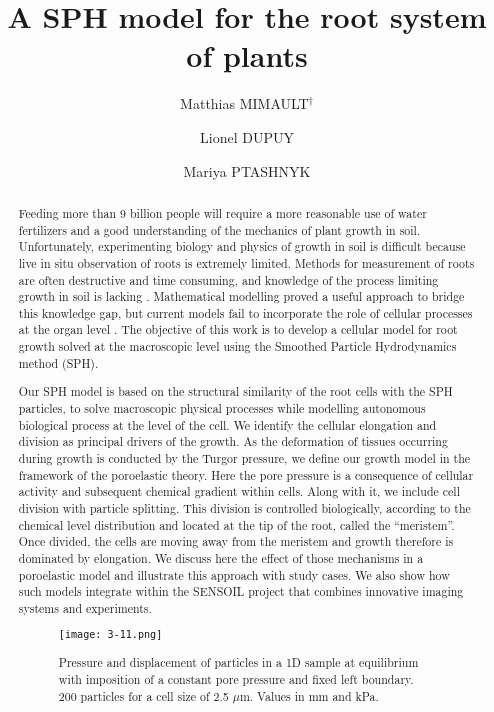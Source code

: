 \documentclass[10pt]{article}
\title{A SPH model for the root system of plants}
\date{}
\author[1]{Matthias MIMAULT$^\dagger$}
\author[1]{Lionel DUPUY}
\affil[1]{James Hutton Institute, UK}
\author[2]{Mariya PTASHNYK}
\affil[2]{University of Dundee, UK}
\affil[$\relax$]{\email{\dagger}{matthias.mimault@hutton.ac.uk}}
\begin{document}
\maketitle


\begin{abstract}
Feeding more than 9 billion people will require a more reasonable use of water fertilizers and a good understanding of the mechanics of plant growth in soil. Unfortunately, experimenting biology and physics of growth in soil is difficult because live in situ observation of roots is extremely limited. Methods for measurement of roots are often destructive and time consuming, and knowledge of the process limiting growth in soil is lacking \cite{smit2013root}. Mathematical modelling proved a useful approach to bridge this knowledge gap, but current models fail to incorporate the role of cellular processes at the organ level \cite{smith2006plausible}. The objective of this work is to develop a cellular model for root growth solved at the macroscopic level using the Smoothed Particle Hydrodynamics method (SPH). 

Our SPH model is based on the structural similarity of the root cells with the SPH particles, to solve macroscopic physical processes while modelling autonomous biological process at the level of the cell. We identify the cellular elongation and division as principal drivers of the growth. As the deformation of tissues occurring during growth is conducted by the Turgor pressure, we define our growth model in the framework of the poroelastic theory. Here the pore pressure is a consequence of cellular activity and subsequent chemical gradient within cells. Along with it, we include cell division with particle splitting. This division is controlled biologically, according to the chemical level distribution and located at the tip of the root, called the ``meristem''. Once divided, the cells are moving away from the meristem and growth therefore is dominated by elongation. We discuss here the effect of those mechanisms in a poroelastic model and illustrate this approach with study cases. We also show how such models integrate within the SENSOIL project that combines innovative imaging systems and experiments.


\begin{figure}[!htb]
\centering
\texttt{[image: 3-11.png]}
\caption{Pressure and displacement of particles in a 1D sample at equilibrium with imposition of a constant pore pressure and fixed left boundary. 200 particles for a cell size of 2.5 $\mu\mathrm{m}$. Values in mm and kPa.}\label{fig:3}
\end{figure}

\end{abstract}



\addbib
\end{document}
